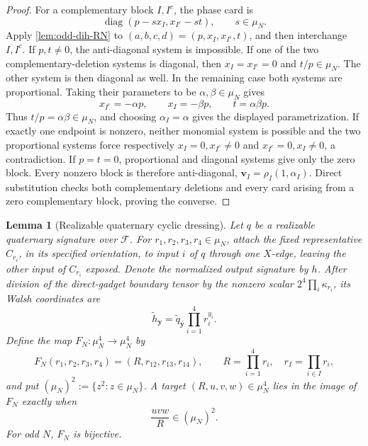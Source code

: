 \documentclass[11pt,letterpaper,onecolumn]{article}
\theoremstyle{plain}
\newtheorem{lemma}[lemma]{Lemma}
\theoremstyle{definition}
\theoremstyle{remark}
\newcommand{\cF}{\mathcal F}
\newcommand{\diag}{\operatorname{diag}}
\begin{document}
\begin{proof}
For a complementary block \(I,I^c\), the phase card is
\[
  \diag(p-sx_I,x_{I^c}-st),
  \qquad s\in\mu_N.
\]
Apply \cref{lem:odd-dih-RN} to
\((a,b,c,d)=(p,x_I,x_{I^c},t)\), and then interchange \(I,I^c\).
If \(p,t\ne0\), the anti-diagonal system is impossible.  If one of the
two complementary-deletion systems is diagonal, then \(x_I=x_{I^c}=0\) and
\(t/p\in\mu_N\). The other system is then diagonal as well.
In the remaining case both systems are proportional.  Taking their
parameters to be \(\alpha,\beta\in\mu_N\) gives
\[
 x_{I^c}=-\alpha p,\qquad x_I=-\beta p,\qquad
 t=\alpha\beta p.
\]
Thus \(t/p=\alpha\beta\in\mu_N\), and choosing
\(\alpha_I=\alpha\) gives the displayed parametrization.  If exactly one
endpoint is nonzero, neither monomial system is possible and the two
proportional systems force respectively \(x_I=0,x_{I^c}\ne0\) and
\(x_{I^c}=0,x_I\ne0\), a contradiction.  If \(p=t=0\), proportional and
diagonal systems give only the zero block. Every nonzero block is therefore
anti-diagonal, \(\mathbf v_I=\rho_I(1,\alpha_I)\).  Direct substitution checks
both complementary deletions and every card arising from a zero complementary
block, proving the converse.
\end{proof}
\begin{lemma}[Realizable quaternary cyclic dressing]
\label{lem:odd-cyc-four-port-dressing}
Let \(q\) be a realizable quaternary signature over \(\cF\).  For
\(r_1,r_2,r_3,r_4\in\mu_N\), attach the fixed representative \(C_{r_i}\), in
its specified orientation, to input \(i\) of \(q\) through one \(X\)-edge, leaving the other input of \(C_{r_i}\) exposed.  Denote the
normalized output signature by \(h\).  After division of the direct-gadget
boundary tensor by the nonzero scalar
\(2^4\prod_i\kappa_{r_i}\), its Walsh coordinates are
\begin{equation*}
  \widetilde h_{\mathbf{y}}
  =\widetilde q_{\mathbf{y}}\prod_{i=1}^4r_i^{y_i}.
\end{equation*}
Define the map \(F_N:\mu_N^4\to\mu_N^4\) by
\begin{equation*}
  F_N(r_1,r_2,r_3,r_4)
  =(R,r_{12},r_{13},r_{14}),
  \qquad
  R=\prod_{i=1}^4r_i,
  \quad r_I=\prod_{i\in I}r_i,
\end{equation*}
and put \((\mu_N)^2:=\{z^2:z\in\mu_N\}\).  A target
\((R,u,v,w)\in\mu_N^4\) lies in the image of \(F_N\) exactly when
\begin{equation}
  \frac{uvw}{R}\in(\mu_N)^2.
  \label{eq:cyclic-dressing-image}
\end{equation}
For odd \(N\), \(F_N\) is bijective.
\end{lemma}
\end{document}

